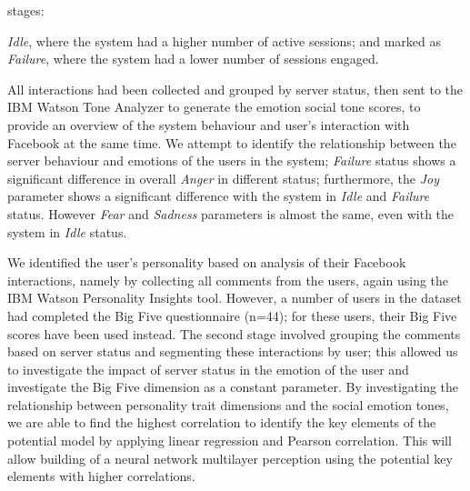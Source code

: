 \documentclass[graybox]{svmult}
\begin{document}
stages: {\emph{Idle}, where the system had a higher number of active
sessions; and marked as {\emph{Failure}}, where the system had a lower
number of sessions engaged. 



All interactions had been collected and grouped by server status, then
sent to the IBM Watson Tone Analyzer to generate the emotion social
tone scores, to provide an overview of the system behaviour and user’s
interaction with Facebook at the same time. We attempt to identify the
relationship between the server behaviour and emotions of the users in
the system; {\emph{Failure}} status shows a significant difference in
overall {\emph{Anger}} in different status; furthermore, the
{\emph{Joy}} parameter shows a significant difference with the system
in {\emph{Idle}} and {\emph{Failure}} status. However {\emph{Fear}}
and {\emph{Sadness}} parameters is almost the same, even with the
system in {\emph{Idle}} status.


We identified the user's personality based on analysis of their
Facebook interactions, namely by collecting all comments from the
users, again using the IBM Watson Personality Insights tool. However,
a number of users in the dataset had completed the Big Five
questionnaire (n=44); for these users, their Big Five scores have
been used instead. The second stage involved grouping the comments
based on server status and segmenting these interactions by user; this
allowed us to investigate the impact of server status in the emotion
of the user and investigate the Big Five dimension as a constant
parameter. By investigating the relationship between personality trait
dimensions and the social emotion tones, we are able to find the
highest correlation to identify the key elements of the potential
model by applying linear regression and Pearson correlation. This will
allow building of a neural network multilayer perception using the
potential key elements with higher correlations.

}
\end{document}
